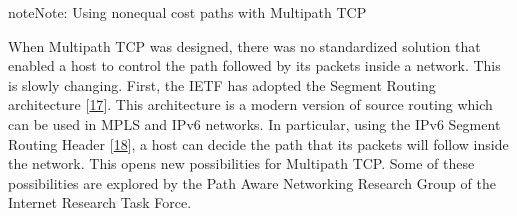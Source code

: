 \documentclass[letterpaper,10pt,english]{sphinxmanual}
\begin{document}
\begin{sphinxadmonition}{note}{Note:}
\sphinxAtStartPar
Using non\sphinxhyphen{}equal cost paths with Multipath TCP

\sphinxAtStartPar
When Multipath TCP was designed, there was no standardized solution that enabled a host to control the path followed by its packets inside a network. This is slowly changing. First, the IETF has adopted the Segment Routing architecture {[}\hyperlink{cite.biblio:id8227}{17}{]}. This architecture is a modern version of source routing which can be used in MPLS and IPv6 networks. In particular, using the IPv6 Segment Routing Header {[}\hyperlink{cite.biblio:id8570}{18}{]}, a host can decide the path that its packets will follow inside the network. This opens new possibilities for Multipath TCP. Some of these possibilities are explored by the Path Aware Networking Research Group of the Internet Research Task Force.
\end{sphinxadmonition}
\end{document}
